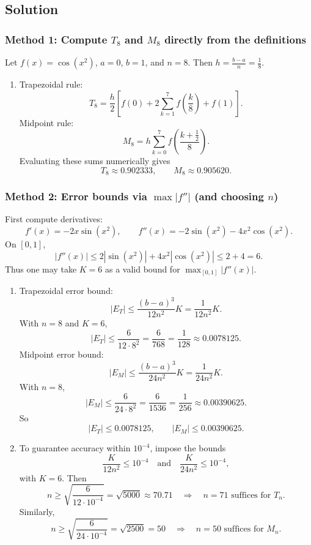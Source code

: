 \documentclass[12pt]{article}
\begin{document}
\subsection*{Solution}

\subsubsection*{Method 1: Compute \(T_8\) and \(M_8\) directly from the definitions}

Let \(f(x)=\cos(x^{2})\), \(a=0\), \(b=1\), and \(n=8\). Then \(h=\frac{b-a}{n}=\frac{1}{8}\).

\begin{enumerate}[label=(\alph*)]
\item Trapezoidal rule:
\[
T_{8}=\frac{h}{2}\left[f(0)+2\sum_{k=1}^{7}f\!\left(\frac{k}{8}\right)+f(1)\right].
\]
Midpoint rule:
\[
M_{8}=h\sum_{k=0}^{7} f\!\left(\frac{k+\tfrac12}{8}\right).
\]
Evaluating these sums numerically gives
\[
\boxed{T_{8}\approx 0.902333,\qquad M_{8}\approx 0.905620.}
\]
\end{enumerate}

\subsubsection*{Method 2: Error bounds via \(\max|f''|\) (and choosing \(n\))}

First compute derivatives:
\[
f'(x)=-2x\sin(x^{2}),\qquad
f''(x)=-2\sin(x^{2})-4x^{2}\cos(x^{2}).
\]
On \([0,1]\),
\[
|f''(x)|\le 2|\sin(x^{2})|+4x^{2}|\cos(x^{2})|\le 2+4=6.
\]
Thus one may take \(K=6\) as a valid bound for \(\max_{[0,1]}|f''(x)|\).

\begin{enumerate}[label=(\alph*)]
\item[\textbf{(b)}] Trapezoidal error bound:
\[
|E_T|\le \frac{(b-a)^{3}}{12n^{2}}K=\frac{1}{12n^{2}}K.
\]
With \(n=8\) and \(K=6\),
\[
|E_T|\le \frac{6}{12\cdot 8^{2}}=\frac{6}{768}=\frac{1}{128}\approx 0.0078125.
\]
Midpoint error bound:
\[
|E_M|\le \frac{(b-a)^{3}}{24n^{2}}K=\frac{1}{24n^{2}}K.
\]
With \(n=8\),
\[
|E_M|\le \frac{6}{24\cdot 8^{2}}=\frac{6}{1536}=\frac{1}{256}\approx 0.00390625.
\]
So
\[
\boxed{|E_T|\le 0.0078125,\qquad |E_M|\le 0.00390625.}
\]

\item[\textbf{(c)}] To guarantee accuracy within \(10^{-4}\), impose the bounds
\[
\frac{K}{12n^{2}}\le 10^{-4}\quad\text{and}\quad \frac{K}{24n^{2}}\le 10^{-4},
\]
with \(K=6\). Then
\[
n\ge \sqrt{\frac{6}{12\cdot 10^{-4}}}=\sqrt{5000}\approx 70.71
\quad\Rightarrow\quad
\boxed{n=71 \text{ suffices for }T_n.}
\]
Similarly,
\[
n\ge \sqrt{\frac{6}{24\cdot 10^{-4}}}=\sqrt{2500}=50
\quad\Rightarrow\quad
\boxed{n=50 \text{ suffices for }M_n.}
\]
\end{enumerate}
\end{document}
